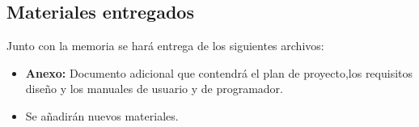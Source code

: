 \subsection{Materiales entregados}
Junto con la memoria se hará entrega de los siguientes archivos:
	\begin{itemize}
	\item \textbf{Anexo:} Documento adicional que contendrá el plan de proyecto,los requisitos diseño y los manuales de usuario y de programador.
	\item Se añadirán nuevos materiales.
	\end{itemize}